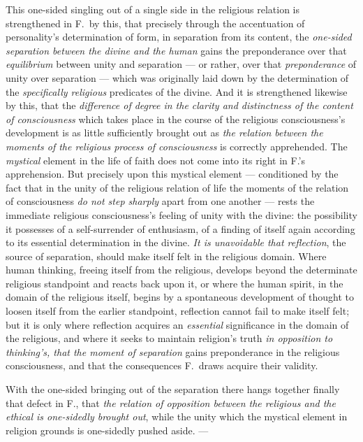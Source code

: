 \documentclass[12pt,a4paper]{book}
\begin{document}
This one-sided singling out of a single side in the religious relation is
strengthened in F.\ by this, that precisely through the accentuation of
personality's determination of form, in separation from its content, the
\emph{one-sided separation between the divine and the human} gains the
preponderance over that \emph{equilibrium} between unity and separation --- or
rather, over that \emph{preponderance} of unity over separation --- which was
originally laid down by the determination of the \emph{specifically religious}
predicates of the divine. And it is strengthened likewise by this, that the
\emph{difference of degree in the clarity and distinctness of the content of
consciousness} which takes place in the course of the religious consciousness's
development is as little sufficiently brought out as \emph{the relation between
the moments of the religious process of consciousness} is correctly
apprehended. The \emph{mystical} element in the life of faith does not come
into its right in F.'s apprehension. But precisely upon this mystical element
--- conditioned by the fact that in the unity of the religious relation of life
the moments of the relation of consciousness \emph{do not step sharply} apart
from one another --- rests the immediate religious consciousness's feeling of
unity with the divine: the possibility it possesses of a self-surrender of
enthusiasm, of a finding of itself again according to its essential
determination in the divine. \emph{It is unavoidable that reflection}, the
source of separation, should make itself felt in the religious domain. Where
human thinking, freeing itself from the religious, develops beyond the
determinate religious standpoint and reacts back upon it, or where the human
spirit, in the domain of the religious itself, begins by a spontaneous
development of thought to loosen itself from the earlier standpoint,
reflection cannot fail to make itself felt; but it is only where reflection
acquires an \emph{essential} significance in the domain of the religious, and
where it seeks to maintain religion's truth \emph{in opposition to thinking's,
that the moment of separation} gains preponderance in the religious
consciousness, and that the consequences F.\ draws acquire their validity.

With the one-sided bringing out of the separation there hangs
together finally that defect in F., that \emph{the relation of opposition
between the religious and the ethical is one-sidedly brought out}, while the
unity which the mystical element in religion grounds is one-sidedly pushed
aside. ---
\end{document}
